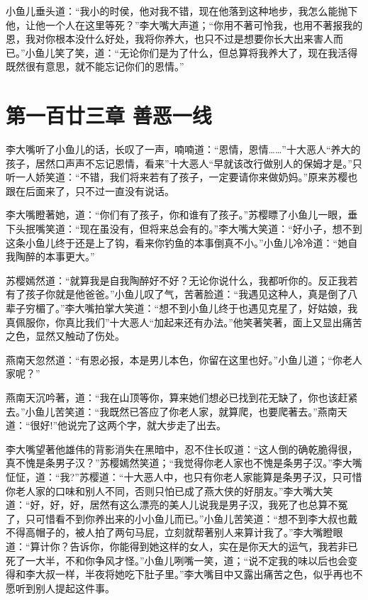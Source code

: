 \documentclass[12pt,oneside]{book}
\begin{document}
小鱼儿垂头道：``我小的时侯，他对我不错，现在他落到这种地步，我怎么能抛下他，让他一个人在这里等死？''李大嘴大声道；``你用不著可怜我，也用不著报我的恩，我对你根本没什么好处，我将你养大，也只不过是想要你长大出来害人而已。''小鱼儿笑了笑，道：``无论你们是为了什么，但总算将我养大了，现在我活得既然很有意思，就不能忘记你们的恩情。''

\hypertarget{ux7b2cux4e00ux767eux5effux4e09ux7ae0-ux5584ux6076ux4e00ux7ebf}{%
\chapter{第一百廿三章
善恶一线}\label{ux7b2cux4e00ux767eux5effux4e09ux7ae0-ux5584ux6076ux4e00ux7ebf}}

李大嘴听了小鱼儿的话，长叹了一声，喃喃道：``恩情，恩情\ldots\ldots{}''十大恶人``养大的孩子，居然口声声不忘记恩情，看来''十大恶人``早就该改行做别人的保姆才是。''只听一人娇笑道：``不错，我们将来若有了孩子，一定要请你来做奶妈。''原来苏樱也跟在后面来了，只不过一直没有说话。

李大嘴瞪著她，道：``你们有了孩子，你和谁有了孩子。''苏樱瞟了小鱼儿一眼，垂下头抿嘴笑道：``现在虽没有，但将来总会有的。''李大嘴大笑道：``好小子，想不到这条小鱼儿终于还是上了钩，看来你钓鱼的本事倒真不小。''小鱼儿冷冷道：``她自我陶醉的本事更大。''

苏樱嫣然道：``就算我是自我陶醉好不好？无论你说什么，我都听你的。反正我若有了孩子你就是他爸爸。''小鱼儿叹了气，苦著脸道：``我遇见这种人，真是倒了八辈子穷楣了。''李大嘴拍掌大笑道：``想不到小鱼儿终于也遇见克星了，好姑娘，我真佩服你，你真比我们''十大恶人``加起来还有办法。''他笑著笑著，面上又显出痛苦之色，显然又触动了伤处。

燕南天忽然道：``有恩必报，本是男儿本色，你留在这里也好。''小鱼儿道；``你老人家呢？''

燕南天沉吟著，道：``我在山顶等你，算来她们想必已找到花无缺了，你也该赶紧去。''小鱼儿苦笑道：``我既然已答应了你老人家，就算爬，也要爬著去。''燕南天道：``很好!''他说完了这两个字，就大步走了出去。

李大嘴望著他雄伟的背影消失在黑暗中，忍不住长叹道：``这人倒的确乾脆得很，真不愧是条男子汉？''苏樱嫣然笑道；``我觉得你老人家也不愧是条男子汉。''李大嘴怔怔，道：``我?''苏樱道：``十大恶人中，也只有你老人家能算是条男子汉，只可惜你老人家的口味和别人不同，否则只怕已成了燕大侠的好朋友。''李大嘴大笑道：``好，好，好，居然有这么漂亮的美人儿说我是男子汉，我死了也总算不冤了，只可惜看不到你养出来的小小鱼儿而已。''小鱼儿苦笑道：``想不到李大叔也戴不得高帽子的，被人拍了两句马屁，立刻就帮著别人来算计我了。''李大嘴瞪眼道：``算计你？告诉你，你能得到她这样的女人，实在是你天大的运气，我若非已死了一大半，不和你争风才怪。''小鱼儿咧嘴一笑，道；``说不定我的味以后也会变得和李大叔一样，半夜将她吃下肚子里。''李大嘴目中又露出痛苦之色，似乎再也不愿听到别人提起这件事。
\end{document}

